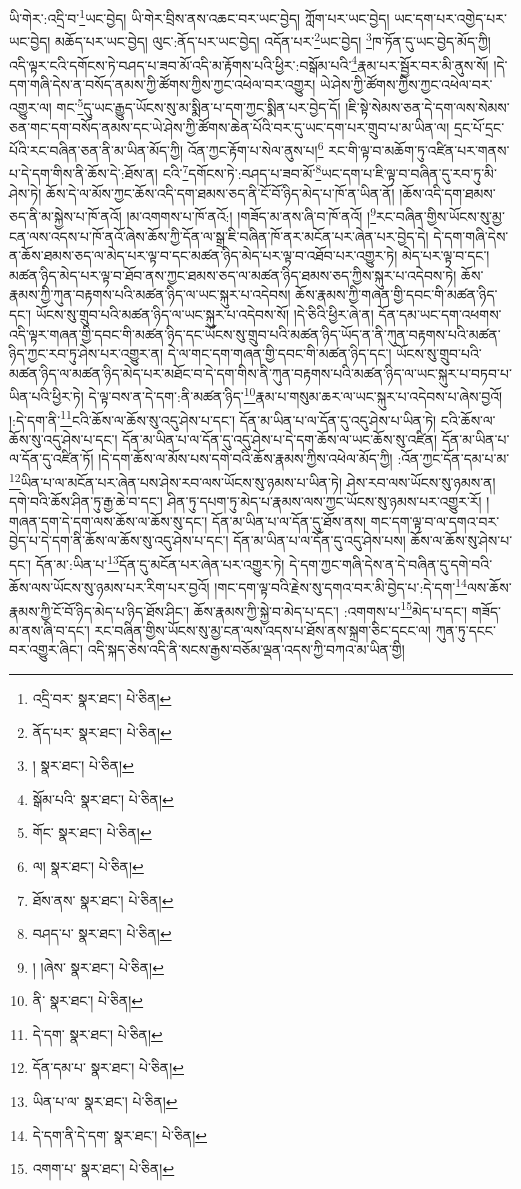 ཡི་གེར་:འདྲི་བ་\footnote{འདྲི་བར་  སྣར་ཐང་།  པེ་ཅིན། }ཡང་བྱེད། ཡི་གེར་བྲིས་ནས་འཆང་བར་ཡང་བྱེད། ཀློག་པར་ཡང་བྱེད། ཡང་དག་པར་འགྱེད་པར་ཡང་བྱེད། མཆོད་པར་ཡང་བྱེད། ལུང་:ནོད་པར་ཡང་བྱེད། འདོན་པར་\footnote{ནོད་པར་  སྣར་ཐང་།  པེ་ཅིན། }ཡང་བྱེད། \footnote{།    སྣར་ཐང་།  པེ་ཅིན། }ཁ་ཏོན་དུ་ཡང་བྱེད་མོད་ཀྱི། འདི་ལྟར་ངའི་དགོངས་ཏེ་བཤད་པ་ཟབ་མོ་འདི་མ་རྟོགས་པའི་ཕྱིར་:བསྒོམ་པའི་\footnote{སྒོམ་པའི་  སྣར་ཐང་།  པེ་ཅིན། }རྣམ་པར་སྦྱོར་བར་མི་ནུས་སོ། །དེ་དག་གཞི་དེས་ན་བསོད་ནམས་ཀྱི་ཚོགས་ཀྱིས་ཀྱང་འཕེལ་བར་འགྱུར། ཡེ་ཤེས་ཀྱི་ཚོགས་ཀྱིས་ཀྱང་འཕེལ་བར་འགྱུར་ལ། གང་\footnote{གོང་  སྣར་ཐང་།  པེ་ཅིན། }དུ་ཡང་རྒྱུད་ཡོངས་སུ་མ་སྨིན་པ་དག་ཀྱང་སྨིན་པར་བྱེད་དོ། །ཇི་སྟེ་སེམས་ཅན་དེ་དག་ལས་སེམས་ཅན་གང་དག་བསོད་ནམས་དང་ཡེ་ཤེས་ཀྱི་ཚོགས་ཆེན་པོའི་བར་དུ་ཡང་དག་པར་གྲུབ་པ་མ་ཡིན་ལ། དྲང་པོ་དྲང་པོའི་རང་བཞིན་ཅན་ནི་མ་ཡིན་མོད་ཀྱི། འོན་ཀྱང་རྟོག་པ་སེལ་ནུས་པ།\footnote{ལ།  སྣར་ཐང་།  པེ་ཅིན། } རང་གི་ལྟ་བ་མཆོག་ཏུ་འཛིན་པར་གནས་པ་དེ་དག་གིས་ནི་ཆོས་དེ་:ཐོས་ན། ངའི་\footnote{ཐོས་ནས་  སྣར་ཐང་།  པེ་ཅིན། }དགོངས་ཏེ་:བཤད་པ་ཟབ་མོ་\footnote{བཤད་པ་  སྣར་ཐང་།  པེ་ཅིན། }ཡང་དག་པ་ཇི་ལྟ་བ་བཞིན་དུ་རབ་ཏུ་མི་ཤེས་ཏེ། ཆོས་དེ་ལ་མོས་ཀྱང་ཆོས་འདི་དག་ཐམས་ཅད་ནི་ངོ་བོ་ཉིད་མེད་པ་ཁོ་ན་ཡིན་ནོ། །ཆོས་འདི་དག་ཐམས་ཅད་ནི་མ་སྐྱེས་པ་ཁོ་ནའོ། །མ་འགགས་པ་ཁོ་ནའོ:། །གཟོད་མ་ནས་ཞི་བ་ཁོ་ནའོ། །\footnote{། །ཞེས་  སྣར་ཐང་།  པེ་ཅིན། }རང་བཞིན་གྱིས་ཡོངས་སུ་མྱ་ངན་ལས་འདས་པ་ཁོ་ནའོ་ཞེས་ཆོས་ཀྱི་དོན་ལ་སྒྲ་ཇི་བཞིན་ཁོ་ནར་མངོན་པར་ཞེན་པར་བྱེད་དེ། དེ་དག་གཞི་དེས་ན་ཆོས་ཐམས་ཅད་ལ་མེད་པར་ལྟ་བ་དང་མཚན་ཉིད་མེད་པར་ལྟ་བ་འཐོབ་པར་འགྱུར་ཏེ། མེད་པར་ལྟ་བ་དང་། མཚན་ཉིད་མེད་པར་ལྟ་བ་ཐོབ་ནས་ཀྱང་ཐམས་ཅད་ལ་མཚན་ཉིད་ཐམས་ཅད་ཀྱིས་སྐུར་པ་འདེབས་ཏེ། ཆོས་རྣམས་ཀྱི་ཀུན་བརྟགས་པའི་མཚན་ཉིད་ལ་ཡང་སྐུར་པ་འདེབས། ཆོས་རྣམས་ཀྱི་གཞན་གྱི་དབང་གི་མཚན་ཉིད་དང་། ཡོངས་སུ་གྲུབ་པའི་མཚན་ཉིད་ལ་ཡང་སྐུར་པ་འདེབས་སོ། །དེ་ཅིའི་ཕྱིར་ཞེ་ན། དོན་དམ་ཡང་དག་འཕགས་འདི་ལྟར་གཞན་གྱི་དབང་གི་མཚན་ཉིད་དང་ཡོངས་སུ་གྲུབ་པའི་མཚན་ཉིད་ཡོད་ན་ནི་ཀུན་བརྟགས་པའི་མཚན་ཉིད་ཀྱང་རབ་ཏུ་ཤེས་པར་འགྱུར་ན། དེ་ལ་གང་དག་གཞན་གྱི་དབང་གི་མཚན་ཉིད་དང་། ཡོངས་སུ་གྲུབ་པའི་མཚན་ཉིད་ལ་མཚན་ཉིད་མེད་པར་མཐོང་བ་དེ་དག་གིས་ནི་ཀུན་བརྟགས་པའི་མཚན་ཉིད་ལ་ཡང་སྐུར་པ་བཏབ་པ་ཡིན་པའི་ཕྱིར་ཏེ། དེ་ལྟ་བས་ན་དེ་དག་:ནི་མཚན་ཉིད་\footnote{ནི་  སྣར་ཐང་།  པེ་ཅིན། }རྣམ་པ་གསུམ་ཆར་ལ་ཡང་སྐུར་པ་འདེབས་པ་ཞེས་བྱའོ། །:དེ་དག་ནི་\footnote{དེ་དག་  སྣར་ཐང་།  པེ་ཅིན། }ངའི་ཆོས་ལ་ཆོས་སུ་འདུ་ཤེས་པ་དང་། དོན་མ་ཡིན་པ་ལ་དོན་དུ་འདུ་ཤེས་པ་ཡིན་ཏེ། ངའི་ཆོས་ལ་ཆོས་སུ་འདུ་ཤེས་པ་དང་། དོན་མ་ཡིན་པ་ལ་དོན་དུ་འདུ་ཤེས་པ་དེ་དག་ཆོས་ལ་ཡང་ཆོས་སུ་འཛིན། དོན་མ་ཡིན་པ་ལ་དོན་དུ་འཛིན་ཏོ། །དེ་དག་ཆོས་ལ་མོས་པས་དགེ་བའི་ཆོས་རྣམས་ཀྱིས་འཕེལ་མོད་ཀྱི། :འོན་ཀྱང་དོན་དམ་པ་མ་\footnote{དོན་དམ་པ་  སྣར་ཐང་།  པེ་ཅིན། }ཡིན་པ་ལ་མངོན་པར་ཞེན་པས་ཤེས་རབ་ལས་ཡོངས་སུ་ཉམས་པ་ཡིན་ཏེ། ཤེས་རབ་ལས་ཡོངས་སུ་ཉམས་ན། དགེ་བའི་ཆོས་ཤིན་ཏུ་རྒྱ་ཆེ་བ་དང་། ཤིན་ཏུ་དཔག་ཏུ་མེད་པ་རྣམས་ལས་ཀྱང་ཡོངས་སུ་ཉམས་པར་འགྱུར་རོ། །གཞན་དག་དེ་དག་ལས་ཆོས་ལ་ཆོས་སུ་དང་། དོན་མ་ཡིན་པ་ལ་དོན་དུ་ཐོས་ནས། གང་དག་ལྟ་བ་ལ་དགའ་བར་བྱེད་པ་དེ་དག་ནི་ཆོས་ལ་ཆོས་སུ་འདུ་ཤེས་པ་དང་། དོན་མ་ཡིན་པ་ལ་དོན་དུ་འདུ་ཤེས་པས། ཆོས་ལ་ཆོས་སུ་ཤེས་པ་དང་། དོན་མ་:ཡིན་པ་\footnote{ཡིན་པ་ལ་  སྣར་ཐང་།  པེ་ཅིན། }དོན་དུ་མངོན་པར་ཞེན་པར་འགྱུར་ཏེ། དེ་དག་ཀྱང་གཞི་དེས་ན་དེ་བཞིན་དུ་དགེ་བའི་ཆོས་ལས་ཡོངས་སུ་ཉམས་པར་རིག་པར་བྱའོ། །གང་དག་ལྟ་བའི་རྗེས་སུ་དགའ་བར་མི་བྱེད་པ་:དེ་དག་\footnote{དེ་དག་ནི་དེ་དག་  སྣར་ཐང་།  པེ་ཅིན། }ལས་ཆོས་རྣམས་ཀྱི་ངོ་བོ་ཉིད་མེད་པ་ཉིད་ཐོས་ཤིང་། ཆོས་རྣམས་ཀྱི་སྐྱེ་བ་མེད་པ་དང་། :འགགས་པ་\footnote{འགག་པ་  སྣར་ཐང་།  པེ་ཅིན། }མེད་པ་དང་། གཟོད་མ་ནས་ཞི་བ་དང་། རང་བཞིན་གྱིས་ཡོངས་སུ་མྱ་ངན་ལས་འདས་པ་ཐོས་ནས་སྐྲག་ཅིང་དངང་ལ། ཀུན་ཏུ་དངང་བར་འགྱུར་ཞིང་། འདི་སྐད་ཅེས་འདི་ནི་སངས་རྒྱས་བཅོམ་ལྡན་འདས་ཀྱི་བཀའ་མ་ཡིན་གྱི། 